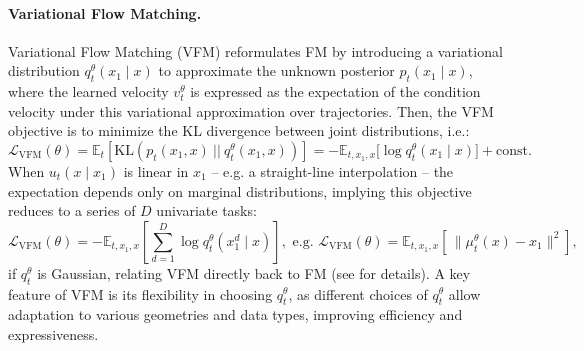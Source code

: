 \paragraph{Variational Flow Matching.}
Variational Flow Matching (VFM) \citep{eijkelboom2024variational} reformulates FM by introducing a variational distribution $q_t^\theta(x_1 \mid x)$ to approximate the unknown posterior $p_t(x_1 \mid x)$, where the learned velocity $v_t^{\theta}$ is expressed as the expectation of the condition velocity under this variational approximation over trajectories. 
Then, the VFM objective is to minimize the KL divergence between joint distributions, i.e.:
\begin{equation}
    \mathcal{L}_{\mathrm{VFM}}(\theta) = \mathbb{E}_t \left[\mathrm{KL}\left(p_t(x_1, x) ~||~ q_t^{\theta}(x_1, x) \right)\right] = -\mathbb{E}_{t, x_1, x} \bigl[ \log q_t^\theta(x_1 \mid x) \bigr] + \text{const.}
\end{equation}
When $u_t(x \mid x_1)$ is linear in $x_1$ -- e.g. a straight-line interpolation -- the expectation depends only on marginal distributions, implying this objective reduces to a series of $D$ univariate tasks:
\begin{equation}\label{eq:vfm}
\mathcal{L}_{\mathrm{VFM}}(\theta) =
-\mathbb{E}_{t, x_1, x} \left[
\sum_{d=1}^{D} \log q_t^{\theta}(x_1^d \mid x) \right], \text{ e.g. }  \mathcal{L}_{\mathrm{VFM}}(\theta) =\mathbb{E}_{t,x_1,x}\left[\,\|\mu_t^{\theta}(x) - x_1\|^2\right],
\end{equation}
if $q_t^{\theta}$ is Gaussian, relating VFM directly back to FM (see \citet{eijkelboom2024variational} for details). A key feature of VFM is its flexibility in choosing $q_t^\theta$, as different choices of $q_t^\theta$ allow adaptation to various geometries and data types, improving efficiency and expressiveness.

